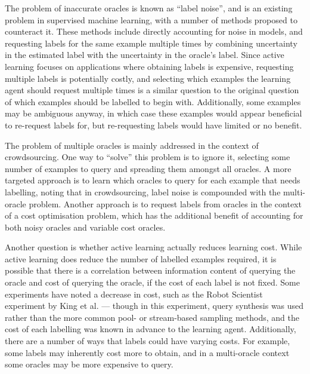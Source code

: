 \documentclass[a4paper]{article}
\begin{document}
        The problem of inaccurate oracles is known as ``label noise'', and is an existing problem in supervised machine learning, with a number of methods proposed to counteract it\cite{frenay14}. These methods include directly accounting for noise in models\cite{natarajan13}, and requesting labels for the same example multiple times by combining uncertainty in the estimated label with the uncertainty in the oracle's label\cite{sheng08,lin16}. Since active learning focuses on applications where obtaining labels is expensive, requesting multiple labels is potentially costly, and selecting which examples the learning agent should request multiple times is a similar question to the original question of which examples should be labelled to begin with. Additionally, some examples may be ambiguous anyway, in which case these examples would appear beneficial to re-request labels for, but re-requesting labels would have limited or no benefit\cite{settles11}.

        The problem of multiple oracles is mainly addressed in the context of crowdsourcing. One way to ``solve'' this problem is to ignore it, selecting some number of examples to query and spreading them amongst all oracles. A more targeted approach is to learn which oracles to query for each example that needs labelling, noting that in crowdsourcing, label noise is compounded with the multi-oracle problem\cite{yan11}. Another approach is to request labels from oracles in the context of a cost optimisation problem, which has the additional benefit of accounting for both noisy oracles and variable cost oracles\cite{donmez08}.

        Another question is whether active learning actually reduces learning cost. While active learning does reduce the number of labelled examples required, it is possible that there is a correlation between information content of querying the oracle and cost of querying the oracle, if the cost of each label is not fixed\cite{settles11}. Some experiments have noted a decrease in cost, such as the Robot Scientist experiment by King et al.\cite{king04} --- though in this experiment, query synthesis was used rather than the more common pool- or stream-based sampling methods, and the cost of each labelling was known in advance to the learning agent. Additionally, there are a number of ways that labels could have varying costs. For example, some labels may inherently cost more to obtain, and in a multi-oracle context some oracles may be more expensive to query\cite{settles11}.
\end{document}
